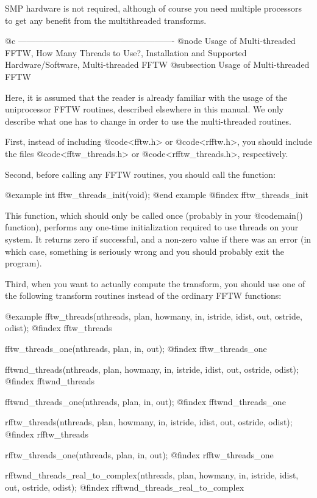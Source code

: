SMP hardware is not required, although of course you need multiple
processors to get any benefit from the multithreaded transforms.

@c -------------------------------------------------------
@node Usage of Multi-threaded FFTW, How Many Threads to Use?, Installation and Supported Hardware/Software, Multi-threaded FFTW
@subsection Usage of Multi-threaded FFTW

Here, it is assumed that the reader is already familiar with the usage
of the uniprocessor FFTW routines, described elsewhere in this manual.
We only describe what one has to change in order to use the
multi-threaded routines.

First, instead of including @code{<fftw.h>} or @code{<rfftw.h>}, you
should include the files @code{<fftw_threads.h>} or
@code{<rfftw_threads.h>}, respectively.

Second, before calling any FFTW routines, you should call the function:

@example
int fftw_threads_init(void);
@end example
@findex fftw_threads_init

This function, which should only be called once (probably in your
@code{main()} function), performs any one-time initialization required
to use threads on your system.  It returns zero if successful, and a
non-zero value if there was an error (in which case, something is
seriously wrong and you should probably exit the program).

Third, when you want to actually compute the transform, you should use
one of the following transform routines instead of the ordinary FFTW
functions:

@example
fftw_threads(nthreads, plan, howmany, in, istride, 
             idist, out, ostride, odist);
@findex fftw_threads

fftw_threads_one(nthreads, plan, in, out);
@findex fftw_threads_one

fftwnd_threads(nthreads, plan, howmany, in, istride,
               idist, out, ostride, odist);
@findex fftwnd_threads

fftwnd_threads_one(nthreads, plan, in, out);
@findex fftwnd_threads_one

rfftw_threads(nthreads, plan, howmany, in, istride, 
              idist, out, ostride, odist);
@findex rfftw_threads

rfftw_threads_one(nthreads, plan, in, out);
@findex rfftw_threads_one

rfftwnd_threads_real_to_complex(nthreads, plan, howmany, in, 
                                istride, idist, out, ostride, odist);
@findex rfftwnd_threads_real_to_complex

